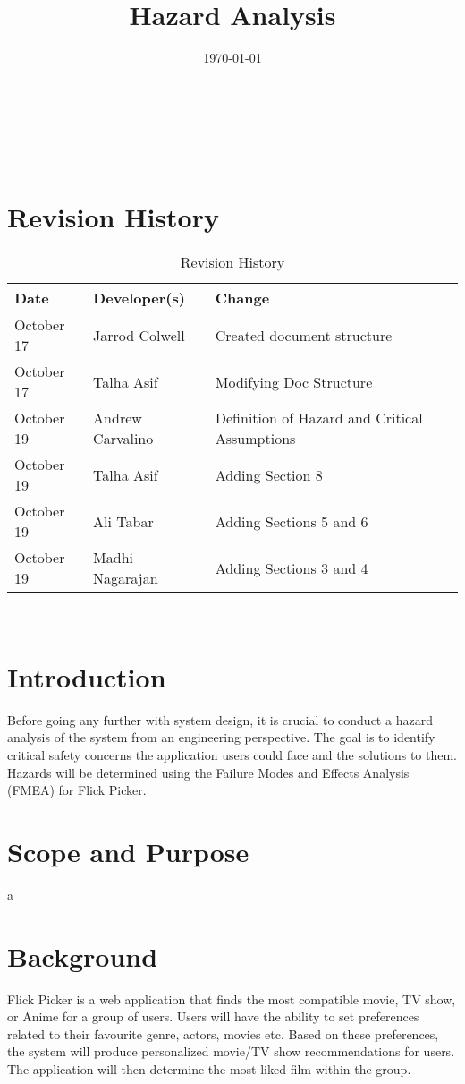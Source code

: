 \documentclass[12pt]{article}
\title{Hazard Analysis\\\progname}
\author{\authname}
\date{\today}
\begin{document}
\maketitle

~\newpage {}

\tableofcontents

~\newpage

\section*{Revision History}
\begin{table}[hp]
	\caption{Revision History} \label{TblRevisionHistory}
	\begin{tabularx}{\textwidth}{llX}
		\toprule
		\textbf{Date} & \textbf{Developer(s)} & \textbf{Change}\\
		\midrule
		October 17 & Jarrod Colwell & Created document structure\\
		October 17 & Talha Asif & Modifying Doc Structure\\
		October 19 & Andrew Carvalino & Definition of Hazard and Critical Assumptions\\
		October 19 & Talha Asif & Adding Section 8\\
		October 19 & Ali Tabar & Adding Sections 5 and 6\\
    October 19 & Madhi Nagarajan & Adding Sections 3 and 4\\
		\bottomrule
		\end{tabularx}
\end{table}

~\newpage {}

\section{Introduction}
Before going any further with system design, it is crucial to conduct a hazard analysis of the system from an engineering perspective. The goal is to identify critical safety concerns the application users could face and the solutions to them. Hazards will be determined using the Failure Modes and Effects Analysis (FMEA) for Flick Picker.

\section{Scope and Purpose}
a

\section{Background}
Flick Picker is a web application that finds the most compatible movie, TV show, or Anime for a group of users. Users will have the ability to set preferences related to their favourite genre, actors, movies etc. Based on these preferences, the system will produce personalized movie/TV show recommendations for users. The application will then determine the most liked film within the group.    
\end{document}
